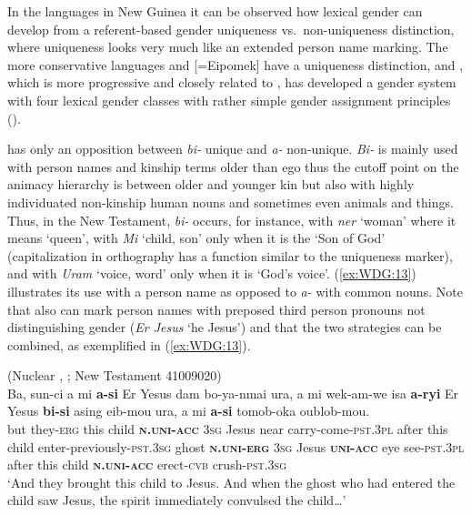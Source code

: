\documentclass[output=collectionpaper]{langsci/langscibook}
\begin{document}
In the  languages in New Guinea it can be observed how lexical gender can develop from a referent-based gender uniqueness vs.\ non-uniqueness distinction, where uniqueness looks very much like an extended person name marking. The more conservative  languages  and  [=Eipomek] have a uniqueness distinction, and , which is more progressive and closely related to , has developed a gender system with four lexical gender classes with rather simple gender assignment principles (\citealt{Waelchli2018}).

 has only an opposition between \textit{bi-} unique and \textit{a-} non-unique. \textit{Bi-} is mainly used with person names and kinship terms older than ego \textendash{} thus the cutoff point on the animacy hierarchy is between older and younger kin \textendash{} but also with highly individuated non-kinship human nouns and sometimes even animals and things. Thus, in the  New Testament, \textit{bi-} occurs, for instance, with \textit{ner} `woman' where it means `queen', with \textit{Mi} `child, son' only when it is the `Son of God' (capitalization in orthography has a function similar to the uniqueness marker), and with \textit{Uram} `voice, word' only when it is `God's voice'. (\ref{ex:WDG:13}) illustrates its use with a person name as opposed to \textit{a-} with common nouns. Note that  also can mark person names with preposed third person pronouns not distinguishing gender (\textit{Er Jesus} `he Jesus') and that the two strategies can be combined, as exemplified in (\ref{ex:WDG:13}).

\ea\label{ex:WDG:13}
 (Nuclear , ; New Testament 41009020)\\
\gll Ba,	sun-ci	a	mi	\textbf{a-si}	Er	Yesus	dam	bo-ya-nmai	ura, a	mi	wek-am-we	isa	\textbf{a-ryi}	Er	Yesus	\textbf{bi-si}	asing	eib-mou	ura,	a	mi	\textbf{a-si}	tomob-oka	oublob-mou.\\
but	they-\textsc{erg}	this	child	\textbf{\textsc{n.uni-acc}}	\textsc{3sg}	Jesus	near	carry-come-\textsc{pst.3pl} after this	child	enter-previously-\textsc{pst.3sg}	ghost	\textbf{\textsc{n.uni-erg}}	\textsc{3sg}	Jesus	\textbf{\textsc{uni-acc}}	eye	see-\textsc{pst.3pl}	after	this	child	\textbf{\textsc{n.uni-acc}}	erect-\textsc{cvb}	crush-\textsc{pst.3sg}\\
\glt `And they brought this child to Jesus. And when the ghost who had entered the child saw Jesus, the spirit immediately convulsed the child{\dots}'\\
\z
\end{document}
